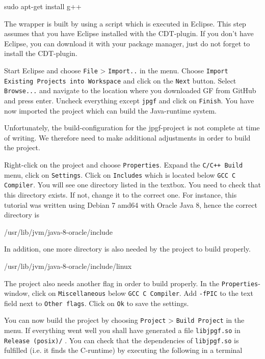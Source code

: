 \begin{terminal}
sudo apt-get install g++
\end{terminal}

The wrapper is built by using a script which is executed in Eclipse. This step assumes that you have Eclipse installed with the CDT-plugin. If you don't have Eclipse, you can download it with your package manager, just do not forget to install the CDT-plugin.

Start Eclipse and choose \texttt{File} > \texttt{Import..} in the menu. Choose \texttt{Import Existing Projects into Workspace} and click on the \texttt{Next} button. Select \texttt{Browse...} and navigate to the location where you downloaded GF from GitHub and press enter. Uncheck everything except \texttt{jpgf} and click on \texttt{Finish}. You have now imported the project which can build the Java-runtime system. 

Unfortunately, the build-configuration for the jpgf-project is not complete at time of writing. We therefore need to make additional adjustments in order to build the project.

Right-click on the project and choose \texttt{Properties}. Expand the \texttt{C/C++ Build} menu, click on \texttt{Settings}. Click on \texttt{Includes} which is located below \texttt{GCC C Compiler}. You will see one directory listed in the textbox. You need to check that this directory exists. If not, change it to the correct one. For instance, this tutorial was written using Debian 7 amd64 with Oracle Java 8, hence the correct directory is

\begin{terminal}
/usr/lib/jvm/java-8-oracle/include
\end{terminal}

In addition, one more directory is also needed by the project to build properly.

\begin{terminal}
/usr/lib/jvm/java-8-oracle/include/linux
\end{terminal}

The project also needs another flag in order to build properly. In the \texttt{Properties}-window, click on \texttt{Miscellaneous} below \texttt{GCC C Compiler}. Add \texttt{-fPIC} to the text field next to \texttt{Other flags}. Click on \texttt{Ok} to save the settings.

You can now build the project by choosing \texttt{Project} > \texttt{Build Project} in the menu. If everything went well you shall have generated a file \texttt{libjpgf.so} in \texttt{Release (posix)/} . You can check that the dependencies of \texttt{libjpgf.so} is fulfilled (i.e. it finds the C-runtime) by executing the following in a terminal

